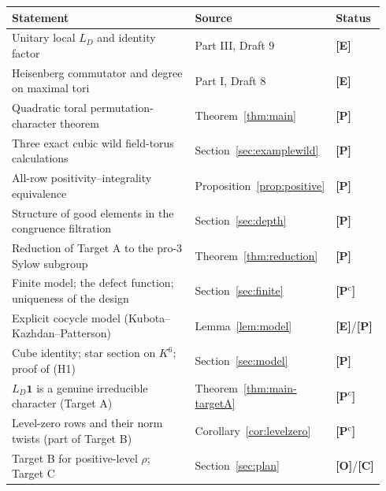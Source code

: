 \documentclass[11pt]{article}
\newcommand{\Ptag}{\textnormal{\textbf{[P]}}}
\newcommand{\Pctag}{\textnormal{\textbf{[P$^{\mathrm c}$]}}}
\newcommand{\Etag}{\textnormal{\textbf{[E]}}}
\newcommand{\Otag}{\textnormal{\textbf{[O]}}}
\newcommand{\Ctag}{\textnormal{\textbf{[C]}}}
\theoremstyle{plain}
\theoremstyle{definition}
\begin{document}
\begin{center}\small
\begin{tabular}{@{}p{0.60\linewidth}p{0.26\linewidth}p{0.08\linewidth}@{}}
\toprule
Statement & Source & Status\\\midrule
Unitary local $L_D$ and identity factor & Part III, Draft 9 & \Etag\\
Heisenberg commutator and degree on maximal tori & Part I, Draft 8 & \Etag\\
Quadratic toral permutation-character theorem & Theorem~\ref{thm:main} & \Ptag\\
Three exact cubic wild field-torus calculations & Section~\ref{sec:examplewild} & \Ptag\\
All-row positivity--integrality equivalence & Proposition~\ref{prop:positive} & \Ptag\\
Structure of good elements in the congruence filtration & Section~\ref{sec:depth} & \Ptag\\
Reduction of Target A to the pro-$3$ Sylow subgroup & Theorem~\ref{thm:reduction} & \Ptag\\
Finite model; the defect function; uniqueness of the design & Section~\ref{sec:finite} & \Pctag\\
Explicit cocycle model (Kubota--Kazhdan--Patterson) & Lemma~\ref{lem:model} & \Etag/\Ptag\\
Cube identity; star section on $K^6$; proof of (H1) & Section~\ref{sec:model} & \Ptag\\
$L_D\mathbf1$ is a genuine irreducible character (Target A) & Theorem~\ref{thm:main-targetA} & \Pctag\\
Level-zero rows and their norm twists (part of Target B) & Corollary~\ref{cor:levelzero} & \Pctag\\
Target B for positive-level $\rho$; Target C & Section~\ref{sec:plan} & \Otag/\Ctag\\
\bottomrule
\end{tabular}
\end{center}
\end{document}
